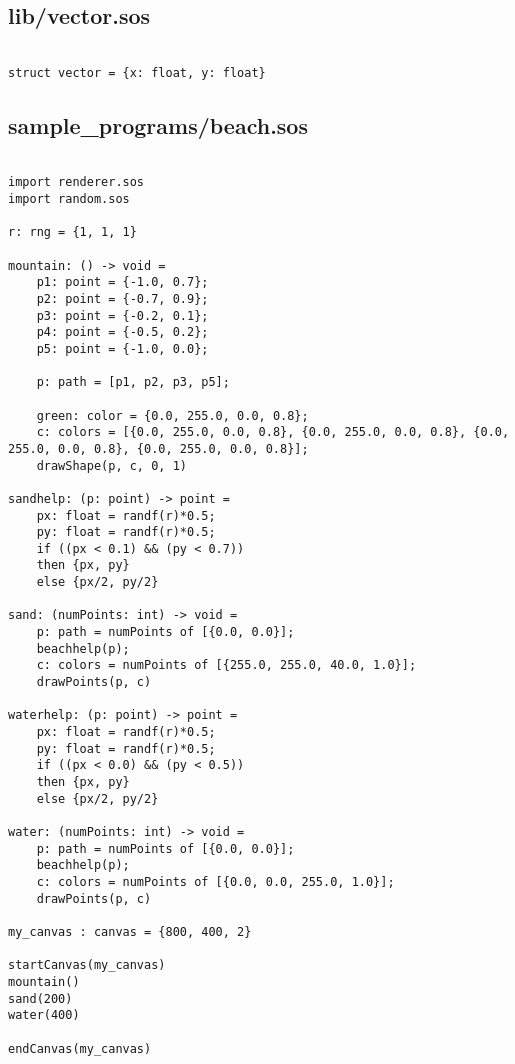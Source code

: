 \documentclass[main.tex]{subfiles}
\begin{document}
\subsection{lib/vector.sos}

\begin{lstlisting}

struct vector = {x: float, y: float}

\end{lstlisting}

\subsection{sample\_programs/beach.sos}

\begin{lstlisting}

import renderer.sos
import random.sos

r: rng = {1, 1, 1}

mountain: () -> void = 
    p1: point = {-1.0, 0.7};
    p2: point = {-0.7, 0.9};
    p3: point = {-0.2, 0.1};
    p4: point = {-0.5, 0.2};
    p5: point = {-1.0, 0.0};

    p: path = [p1, p2, p3, p5];

    green: color = {0.0, 255.0, 0.0, 0.8};
    c: colors = [{0.0, 255.0, 0.0, 0.8}, {0.0, 255.0, 0.0, 0.8}, {0.0, 255.0, 0.0, 0.8}, {0.0, 255.0, 0.0, 0.8}];
    drawShape(p, c, 0, 1)

sandhelp: (p: point) -> point =
    px: float = randf(r)*0.5;
    py: float = randf(r)*0.5;
    if ((px < 0.1) && (py < 0.7))
    then {px, py}
    else {px/2, py/2}

sand: (numPoints: int) -> void =
    p: path = numPoints of [{0.0, 0.0}];
    beachhelp(p);
    c: colors = numPoints of [{255.0, 255.0, 40.0, 1.0}];
    drawPoints(p, c)

waterhelp: (p: point) -> point =
    px: float = randf(r)*0.5;
    py: float = randf(r)*0.5;
    if ((px < 0.0) && (py < 0.5))
    then {px, py}
    else {px/2, py/2}

water: (numPoints: int) -> void =
    p: path = numPoints of [{0.0, 0.0}];
    beachhelp(p);
    c: colors = numPoints of [{0.0, 0.0, 255.0, 1.0}];
    drawPoints(p, c)

my_canvas : canvas = {800, 400, 2}

startCanvas(my_canvas)
mountain()
sand(200)
water(400)

endCanvas(my_canvas)
\end{lstlisting}
\end{document}
